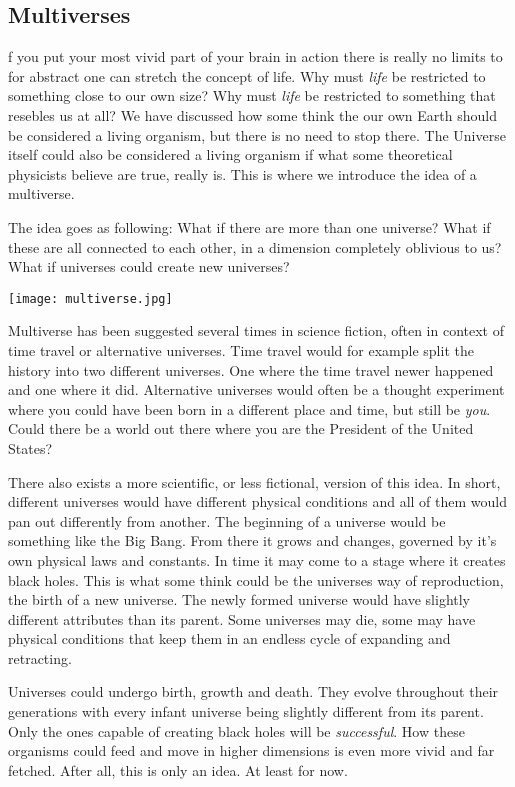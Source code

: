 \subsection{Multiverses}
f you put your most vivid part of your brain in action there is really no limits to for abstract one can stretch the concept of life.
Why must \textit{life} be restricted to something close to our own size?
Why must \textit{life} be restricted to something that resebles us at all?
We have discussed how some think the our own Earth should be considered a living organism, but there is no need to stop there.
The Universe itself could also be considered a living organism if what some theoretical physicists believe are true, really is.
This is where we introduce the idea of a multiverse.

The idea goes as following:
What if there are more than one universe?
What if these are all connected to each other, in a dimension completely oblivious to us?
What if universes could create new universes?

\begin{center}
	\texttt{[image: multiverse.jpg]}
\end{center}

Multiverse has been suggested several times in science fiction, often in context of time travel or alternative universes.
Time travel would for example split the history into two different universes.
One where the time travel newer happened and one where it did.
Alternative universes would often be a thought experiment where you could have been born in a different place and time, but still be \textit{you}.
Could there be a world out there where you are the President of the United States?

There also exists a more scientific, or less fictional, version of this idea.
In short, different universes would have different physical conditions and all of them would pan out differently from another.
The beginning of a universe would be something like the Big Bang.
From there it grows and changes, governed by it's own physical laws and constants.
In time it may come to a stage where it creates black holes.
This is what some think could be the universes way of reproduction, the birth of a new universe.
The newly formed universe would have slightly different attributes than its parent.
Some universes may die, some may have physical conditions that keep them in an endless cycle of expanding and retracting.

Universes could undergo birth, growth and death.
They evolve throughout their generations with every infant universe being slightly different from its parent.
Only the ones capable of creating black holes will be \textit{successful}.
How these organisms could feed and move in higher dimensions is even more vivid and far fetched.
After all, this is only an idea.
At least for now.